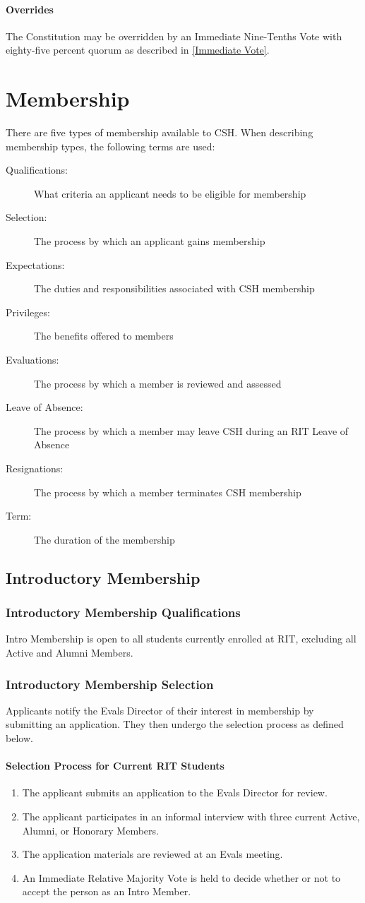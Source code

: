\documentclass{article}
\newcommand{\article}[1]{\section{#1} \label{#1}}
\newcommand{\asection}[1]{\subsection{#1} \label{#1}}
\newcommand{\asubsection}[1]{\subsubsection{#1} \label{#1}}
\newcommand{\asubsubsection}[1]{\paragraph{#1} \label{#1}}
\begin{document}
\asubsubsection{Overrides}
The Constitution may be overridden by an Immediate Nine-Tenths Vote with eighty-five percent quorum as described in \ref{Immediate Vote}.

\article{Membership}
There are five types of membership available to CSH.
When describing membership types, the following terms are used:
\begin{description}
	\item[Qualifications:] What criteria an applicant needs to be eligible for membership
	\item[Selection:] The process by which an applicant gains membership
	\item[Expectations:] The duties and responsibilities associated with CSH membership
	\item[Privileges:] The benefits offered to members
	\item[Evaluations:] The process by which a member is reviewed and assessed
	\item[Leave of Absence:] The process by which a member may leave CSH during an RIT Leave of Absence
	\item[Resignations:] The process by which a member terminates CSH membership
	\item[Term:] The duration of the membership
\end{description}

\asection{Introductory Membership}

\asubsection{Introductory Membership Qualifications}
Intro Membership is open to all students currently enrolled at RIT, excluding all Active and Alumni Members.

\asubsection{Introductory Membership Selection}
Applicants notify the Evals Director of their interest in membership by submitting an application.
They then undergo the selection process as defined below.

\asubsubsection{Selection Process for Current RIT Students}
\renewcommand{\theenumi}{\arabic{enumi}} %
\begin{enumerate}
	\item The applicant submits an application to the Evals Director for review.
	\item The applicant participates in an informal interview with three current Active, Alumni, or Honorary Members.
	\item The application materials are reviewed at an Evals meeting.
	\item An Immediate Relative Majority Vote is held to decide whether or not to accept the person as an Intro Member.
\end{enumerate}
\end{document}
